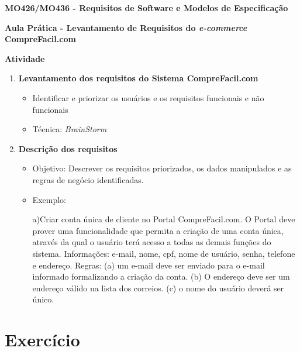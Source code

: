 \documentclass[12pt,twoside,a4paper]{article}
\begin{document}
\vskip 15mm

\begin{center} 
\textbf{MO426/MO436 - Requisitos de Software e Modelos de Especificação}

\textbf{Aula Prática - Levantamento de Requisitos do \textit{e-commerce}
CompreFacil.com}

\end{center}

\vskip 5mm

\vskip 20mm

\textbf{Atividade}

\begin{enumerate}
\item \textbf{Levantamento dos requisitos do Sistema CompreFacil.com}

	\begin{itemize}

		\item Identificar e priorizar os usuários e os requisitos funcionais e não funcionais
		\item Técnica: \textit{BrainStorm} 

	\end{itemize}
	
\item \textbf{Descrição dos requisitos}

	\begin{itemize}
	
	\item Objetivo: Descrever os requisitos priorizados, os dados manipulados e as regras de negócio identificadas.
	\item Exemplo: 

	a)Criar conta única de cliente no Portal CompreFacil.com. O Portal
	deve prover uma funcionalidade que permita a criação de uma conta única,
	através da qual o usuário terá acesso a todas as demais funções do sistema. Informações: e-mail, nome, cpf, nome de usuário, senha, telefone e endereço. Regras: (a) 	um e-mail deve ser enviado para o e-mail informado formalizando a criação da conta. (b) O endereço deve ser um endereço válido na lista dos correios. (c) o nome do usuário deverá ser único.
	
	\end{itemize}

\end{enumerate}
\newpage
\pagestyle{plain}
\headheight 0.0cm
\headsep 0.0cm
\footskip 2.2cm

\section{Exercício}
\label{sec:01}
\end{document}
